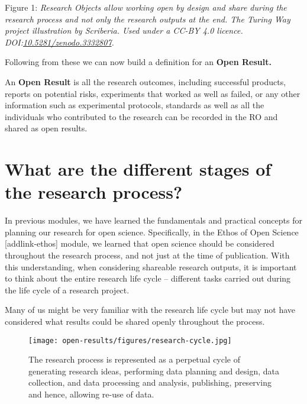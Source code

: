 \documentclass[
  letterpaper,
  DIV=11,
  numbers=noendperiod]{scrreport}
\begin{document}
Figure 1: \emph{Research Objects allow working open by design and share
during the research process and not only the research outputs at the
end. The Turing Way project illustration by Scriberia. Used under a
CC-BY 4.0 licence.
DOI:}\href{https://doi.org/10.5281/zenodo.3332807}{\emph{10.5281/zenodo.3332807}}\emph{.}

Following from these we can now build a definition for an \textbf{Open
Result.}

An \textbf{Open Result} is all the research outcomes, including
successful products, reports on potential risks, experiments that worked
as well as failed, or any other information such as experimental
protocols, standards as well as all the individuals who contributed to
the research can be recorded in the RO and shared as open results.

\hypertarget{what-are-the-different-stages-of-the-research-process}{%
\section{What are the different stages of the research
process?}\label{what-are-the-different-stages-of-the-research-process}}

In previous modules, we have learned the fundamentals and practical
concepts for planning our research for open science. Specifically, in
the Ethos of Open Science {[}addlink-ethos{]} module, we learned that
open science should be considered throughout the research process, and
not just at the time of publication. With this understanding, when
considering shareable research outputs, it is important to think about
the entire research life cycle -- different tasks carried out during the
life cycle of a research project.

Many of us might be very familiar with the research life cycle but may
not have considered what results could be shared openly throughout the
process.

\begin{figure}

{\centering \texttt{[image: open-results/figures/research-cycle.jpg]}

}

\caption{The research process is represented as a perpetual cycle of
generating research ideas, performing data planning and design, data
collection, and data processing and analysis, publishing, preserving and
hence, allowing re-use of data.}

\end{figure}
\end{document}
